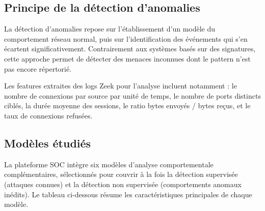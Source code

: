 \documentclass[12pt,a4paper,oneside]{report}
\begin{document}
	\subsection{Principe de la détection d'anomalies}
	
	La détection d'anomalies repose sur l'établissement d'un modèle du comportement
	réseau normal, puis sur l'identification des événements qui s'en écartent
	significativement. Contrairement aux systèmes basés sur des signatures, cette
	approche permet de détecter des menaces inconnues dont le pattern n'est pas
	encore répertorié.
	
	Les features extraites des logs Zeek pour l'analyse incluent notamment :
	le nombre de connexions par source par unité de temps, le nombre de ports
	distincts ciblés, la durée moyenne des sessions, le ratio bytes envoyés /
	bytes reçus, et le taux de connexions refusées.
	
	\subsection{Modèles étudiés}
	
	La plateforme SOC intègre six modèles d'analyse comportementale complémentaires, sélectionnés pour couvrir à la fois la détection supervisée (attaques connues) et la détection non supervisée (comportements anomaux inédits). Le tableau ci-dessous résume les caractéristiques principales de chaque modèle.
	
\end{document}

